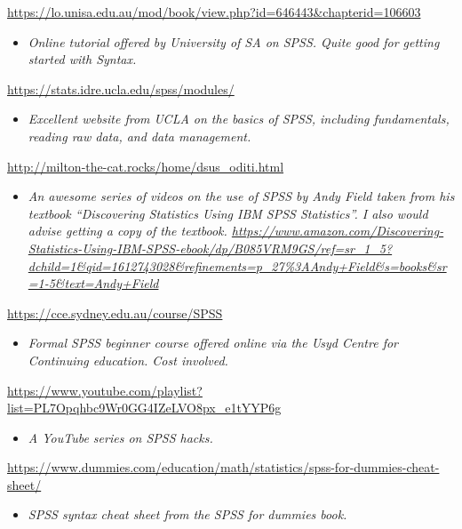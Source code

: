 \documentclass[
]{book}
\providecommand{\tightlist}{%
  \setlength{\itemsep}{0pt}\setlength{\parskip}{0pt}}
\begin{document}
\url{https://lo.unisa.edu.au/mod/book/view.php?id=646443\&chapterid=106603}

\begin{itemize}
\tightlist
\item
  \emph{Online tutorial offered by University of SA on SPSS. Quite good for getting started with Syntax.}
\end{itemize}

\url{https://stats.idre.ucla.edu/spss/modules/}

\begin{itemize}
\tightlist
\item
  \emph{Excellent website from UCLA on the basics of SPSS, including fundamentals, reading raw data, and data management.}
\end{itemize}

\url{http://milton-the-cat.rocks/home/dsus_oditi.html}

\begin{itemize}
\tightlist
\item
  \emph{An awesome series of videos on the use of SPSS by Andy Field taken from his textbook ``Discovering Statistics Using IBM SPSS Statistics''. I also would advise getting a copy of the textbook. \url{https://www.amazon.com/Discovering-Statistics-Using-IBM-SPSS-ebook/dp/B085VRM9GS/ref=sr_1_5?dchild=1\&qid=1612743028\&refinements=p_27\%3AAndy+Field\&s=books\&sr=1-5\&text=Andy+Field}}
\end{itemize}

\url{https://cce.sydney.edu.au/course/SPSS}

\begin{itemize}
\tightlist
\item
  \emph{Formal SPSS beginner course offered online via the Usyd Centre for Continuing education. Cost involved. }
\end{itemize}

\url{https://www.youtube.com/playlist?list=PL7Opqhbc9Wr0GG4IZeLVO8px_e1tYYP6g}

\begin{itemize}
\tightlist
\item
  \emph{A YouTube series on SPSS hacks.}
\end{itemize}

\url{https://www.dummies.com/education/math/statistics/spss-for-dummies-cheat-sheet/}

\begin{itemize}
\tightlist
\item
  \emph{SPSS syntax cheat sheet from the SPSS for dummies book. }
\end{itemize}
\end{document}
